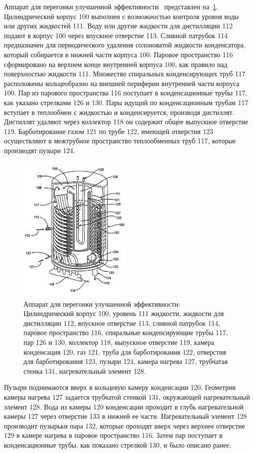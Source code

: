 Аппарат для перегонки улучшенной эффективности~\cite{Lee.Fluid.2007} представлен на~\cref{fig:evaporation_app_lee}.
Цилиндрический корпус 100 выполнен с возможностью контроля уровня воды или других жидкостей 111.
Воду или другие жидкости для дистилляции 112 подают в корпус 100 через впускное отверстие 113.
Сливной патрубок 114 предназначен для периодического удаления солоноватой жидкости конденсатора, который собирается в нижней части корпуса 100.
Паровое пространство 116 сформировано на верхнем конце внутренней корпуса 100, как правило над поверхностью жидкости 111.
Множество спиральных конденсирующих труб 117 расположены кольцеобразно на внешней периферии внутренней части корпуса 100.
Пар из парового пространства 116 поступает в конденсационные трубы 117, как указано стрелками 126 и 130.
Пары идущий по конденсационным трубам 117 вступает в теплообмен с жидкостью и конденсируется, производя дистиллят.
Дистиллят удаляют через коллектор 118 он содержит общее выпускное отверстие 119.
Барботирование газом 121 по трубе 122, имеющей отверстия 123 осуществляют в межтрубное пространство теплообменных труб 117, которые производят пузыри 124.
\begin{figure}[tb]
\centering
\includegraphics[width=0.5\textwidth]{figures/temp/lee.jpg}
\caption[Аппарат для перегонки улучшенной эффективности]{Аппарат для перегонки улучшенной эффективности: Цилиндрический корпус 100, уровень 111 жидкости, жидкости для дистилляции 112, впускное отверстие 113, сливной патрубок 114, паровое пространство 116, спиральные конденсирующие трубы 117, пар 126 и 130, коллектор 118, выпускное отверстие 119, камера конденсация 120, газ 121, труба для барботирования 122, отверстия для барботирования 123, пузыри 124, камера нагрева 127, трубчатая стенка 131, нагревательный элемент 128.}\label{fig:evaporation_app_lee}
\end{figure}
Пузыри поднимаются вверх в кольцевую камеру конденсации 120.
Геометрия камеры нагрева 127 задается трубчатой стенкой 131, окружающей нагревательный элемент 128.
Вода из камеры 120 конденсации проходит в глубь нагревательной камеры 127 через отверстие 133 в нижней ее части.
Нагревательный элемент 128 производит пузырьки пара 132, которые проходят вверх через верхнее отверстие 129 в камере нагрева в паровое пространство 116.
Затем пар поступает в конденсационные трубы, как показано стрелкой 130, и было описано ранее.



